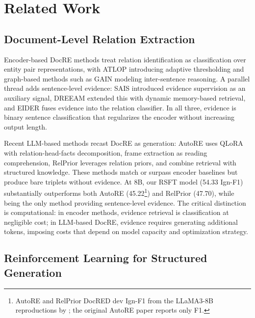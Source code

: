 \section{Related Work}
\label{sec:related_work}

\subsection{Document-Level Relation Extraction}
\label{sec:rw_docre}

Encoder-based DocRE methods treat relation identification as classification over entity pair representations, with ATLOP \citep{zhou2021atlop} introducing adaptive thresholding and graph-based methods such as GAIN \citep{zeng2020gain} modeling inter-sentence reasoning. A parallel thread adds sentence-level evidence: SAIS \citep{xiao2022sais} introduced evidence supervision as an auxiliary signal, DREEAM \citep{ma2023dreeam} extended this with dynamic memory-based retrieval, and EIDER \citep{xie2022eider} fuses evidence into the relation classifier. In all three, evidence is binary sentence classification that regularizes the encoder without increasing output length.

Recent LLM-based methods recast DocRE as generation: AutoRE \citep{autore2024} uses QLoRA with relation-head-facts decomposition, \citet{xu2024lmrc} frame extraction as reading comprehension, RelPrior \citep{wang2025relprior} leverages relation priors, and \citet{xu2025docksrag} combine retrieval with structured knowledge. These methods match or surpass encoder baselines but produce bare triplets without evidence. At 8B, our RSFT model (54.33 Ign-F1) substantially outperforms both AutoRE (45.22\footnote{AutoRE and RelPrior DocRED dev Ign-F1 from the LLaMA3-8B reproductions by \citet{wang2025relprior}; the original AutoRE paper reports only F1.}) and RelPrior (47.70), while being the only method providing sentence-level evidence. The critical distinction is computational: in encoder methods, evidence retrieval is classification at negligible cost; in LLM-based DocRE, evidence requires generating additional tokens, imposing costs that depend on model capacity and optimization strategy.

\subsection{Reinforcement Learning for Structured Generation}
\label{sec:rw_rl}

